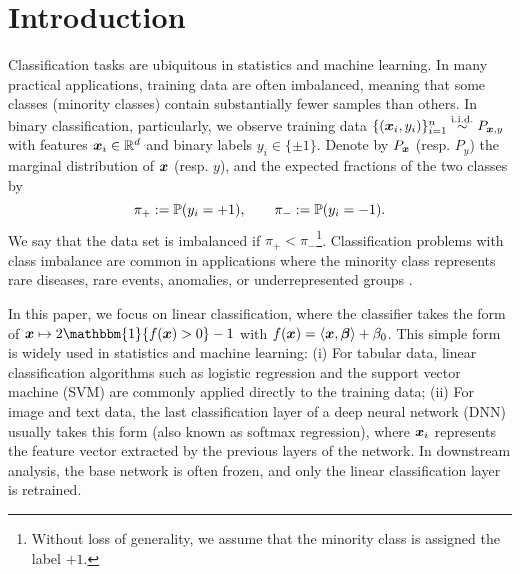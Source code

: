 \section{Introduction}\label{sec:intro}


Classification tasks are ubiquitous in statistics and machine learning. In many practical applications, training data are often imbalanced, meaning that some classes (minority classes) contain substantially fewer samples than others. In binary classification, particularly, we observe training data $\{(\vx_i, y_i)\}_{i = 1}^n \stackrel{\mathrm{i.i.d.}}{\sim} P_{\xx,y}$ with features $\xx_i \in \R^d$ and binary labels $y_i \in \{\pm 1\}$. Denote by $P_{\vx}$ (resp. $P_y$) the marginal distribution of $\vx$ (resp. $y$), and the expected fractions of the two classes by
\begin{equation*}
\pi_+ := \P(y_i = +1), \qquad \pi_- :=  \P(y_i = -1).
\end{equation*}
We say that the data set is imbalanced if $\pi_+ < \pi_-$\footnote{Without loss of generality, we assume that the minority class is assigned the label $+1$.}. 
Classification problems with class imbalance are common in applications where the minority class represents rare diseases, rare events, anomalies, or underrepresented groups \cite{litjens2017survey, tschandl2018ham10000, king2001logistic, kubat1998machine, ngai2011application, chandola2009anomaly, weiss2003learning, buolamwini2018gender}.

In this paper, we focus on linear classification, where the classifier takes the form of 
$\vx \mapsto 2 \mathbbm{1}\{ f(\vx) > 0\} - 1$ with $f(\vx) = \langle \vx, \vbeta \rangle + \beta_0$. This simple form is widely used in statistics and machine learning: (i) For tabular data, linear classification algorithms such as logistic regression and the support vector machine (SVM) are commonly applied directly to the training data; (ii) For image and text data, the last classification layer of a deep neural network (DNN) usually takes this form (also known as softmax regression), where $\vx_i$ represents the feature vector extracted by the previous layers of the network. In downstream analysis, the base network is often frozen, and only the linear classification layer is retrained.


